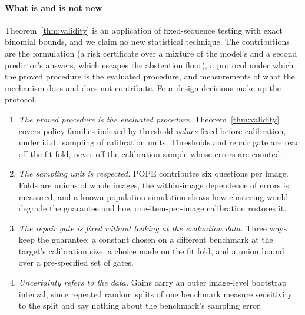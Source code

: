 \paragraph{What is and is not new}
Theorem~\ref{thm:validity} is an application of fixed-sequence testing \citep{angelopoulos2021ltt} with exact binomial bounds, and we claim no new
statistical technique. The contributions are the formulation (a risk certificate over a mixture of the model's and a second predictor's
answers, which escapes the abstention floor), a protocol under which the proved procedure is the evaluated procedure, and measurements of what the
mechanism does and does not contribute. Four design decisions make up the protocol.

\begin{enumerate}
\item \emph{The proved procedure is the evaluated procedure.} Theorem~\ref{thm:validity} covers policy families indexed by threshold
  \emph{values} fixed before calibration, under i.i.d.\ sampling of calibration units. Thresholds and repair gate are read off the fit fold,
  never off the calibration sample whose errors are counted.
\item \emph{The sampling unit is respected.} POPE contributes six questions per image. Folds are unions of whole images, the within-image
  dependence of errors is measured, and a known-population simulation shows how clustering would degrade the guarantee and how
  one-item-per-image calibration restores it.
\item \emph{The repair gate is fixed without looking at the evaluation data.} Three ways keep the guarantee: a constant chosen on a
  different benchmark at the target's calibration size, a choice made on the fit fold, and a union bound over a pre-specified set of gates.
\item \emph{Uncertainty refers to the data.} Gains carry an outer image-level bootstrap interval, since repeated random splits of one
  benchmark measure sensitivity to the split and say nothing about the benchmark's sampling error.
\end{enumerate}

